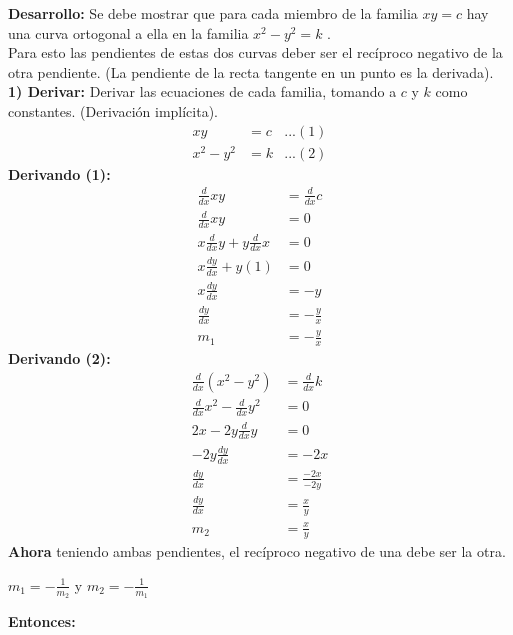 \textbf{Desarrollo:}\newline
Se debe mostrar que para cada miembro de la familia $xy = c$ hay una curva ortogonal a ella en la familia  $x^{2} - y^{2} = k$ . \\
Para esto las pendientes de estas dos curvas deber ser el recíproco negativo de la otra pendiente. (La pendiente de la recta tangente en un punto es la derivada).\\
\newline
\textbf{1) Derivar:} Derivar las ecuaciones de cada familia, tomando a $c$ y $k$ como constantes. (Derivación implícita).
\begin{align*}
   xy &= c           &... (1)\\
   x^{2} - y^{2} &= k              &...(2)
\end{align*}
\newline
\textbf{Derivando (1):}
\begin{align*}
    \frac{d}{dx}xy &= \frac{d}{dx}c \\
    \frac{d}{dx}xy &= 0 \\
    x\frac{d}{dx}y  +  y\frac{d}{dx}x &= 0 \\
    x\frac{dy}{dx} +  y(1) &= 0 \\
    x\frac{dy}{dx}  &= -y \\
    \frac{dy}{dx}  &= -\frac{y}{x}\\
    m_{1}  &= -\frac{y}{x}
\end{align*}
\newline
\textbf{Derivando (2):}
\begin{align*}
    \frac{d}{dx}(x^{2} - y^{2}) &= \frac{d}{dx}k \\
    \frac{d}{dx}x^{2} -  \frac{d}{dx}y^{2} &= 0\\
    2x -  2y\frac{d}{dx}y &= 0\\
    -2y\frac{dy}{dx} &= -2x\\
    \frac{dy}{dx} &= \frac{-2x}{-2y}\\
    \frac{dy}{dx} &= \frac{x}{y}\\
    m_{2}  &= \frac{x}{y}
\end{align*}
\newline
\textbf{Ahora} teniendo ambas pendientes, el recíproco negativo de una debe ser la otra. \\
\begin{center}
    $ m_{1}  = -\frac{1}{m_{2}}$      y    $ m_{2}  = -\frac{1}{m_{1}}$\\
\end{center}
\textbf{Entonces:}
